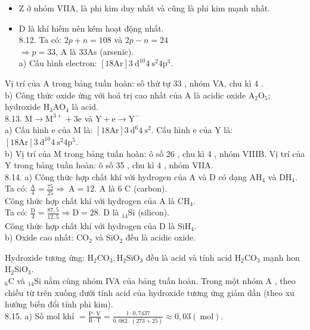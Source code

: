 \documentclass[10pt]{article}
\begin{document}
\begin{itemize}
  \item Z ở nhóm VIIA, là phi kim duy nhất và cũng là phi kim mạnh nhất.
  \item D là khí hiếm nên kém hoạt động nhất.\\
8.12. Ta có: $2 p+n=108$ và $2 p-n=24$\\
$\Rightarrow p=33$, A là 33As (arsenic).\\
a) Cấu hình electron: $[18 \mathrm{Ar}] 3 \mathrm{~d}^{10} 4 \mathrm{~s}^{2} 4 \mathrm{p}^{3}$.
\end{itemize}

Vị trí của A trong bảng tuần hoàn: số thứ tự 33 , nhóm VA, chu kì 4 .\\
b) Công thức oxide ứng với hoá trị cao nhất của A là acidic oxide $\mathrm{A}_{2} \mathrm{O}_{5}$; hydroxide $\mathrm{H}_{3} \mathrm{AO}_{4}$ là acid.\\
8.13. $\mathrm{M} \rightarrow \mathrm{M}^{3+}+3 \mathrm{e}$ và $\mathrm{Y}+\mathrm{e} \rightarrow \mathrm{Y}^{-}$\\
a) Cấu hình e của M là: $[18 \mathrm{Ar}] 3 \mathrm{~d}^{6} 4 \mathrm{~s}^{2}$. Cấu hình e của Y là: $[18 \mathrm{Ar}] 3 \mathrm{~d}^{10} 4 \mathrm{~s}^{2} 4 \mathrm{p}^{5}$.\\
b) Vị trí của M trong bảng tuần hoàn: ô số 26 , chu kì 4 , nhóm VIIIB. Vị trí của Y trong bảng tuần hoàn: ô số 35 , chu kì 4 , nhóm VIIA.\\
8.14. a) Công thức hợp chất khí với hydrogen của A và D có dạng $\mathrm{AH}_{4}$ và $\mathrm{DH}_{4}$. Ta có: $\frac{\mathrm{A}}{4}=\frac{75}{25} \Rightarrow \mathrm{~A}=12$. A là 6 C (carbon).\\
Công thức hợp chất khí với hydrogen của A là $\mathrm{CH}_{4}$.\\
Ta có: $\frac{\mathrm{D}}{4}=\frac{87,5}{12,5} \Rightarrow \mathrm{D}=28$. D là ${ }_{14} \mathrm{Si}$ (silicon).\\
Công thức hợp chất khí với hydrogen của D là $\mathrm{SiH}_{4}$.\\
b) Oxide cao nhất: $\mathrm{CO}_{2}$ và $\mathrm{SiO}_{2}$ đều là acidic oxide.

Hydroxide tương ứng: $\mathrm{H}_{2} \mathrm{CO}_{3}, \mathrm{H}_{2} \mathrm{SiO}_{3}$ đều là acid và tính acid $\mathrm{H}_{2} \mathrm{CO}_{3}$ mạnh hon $\mathrm{H}_{2} \mathrm{SiO}_{3}$.\\
${ }_{6} \mathrm{C}$ và ${ }_{14} \mathrm{Si}$ nằm cùng nhóm IVA của bảng tuần hoàn. Trong một nhóm A , theo chiều từ trên xuống dưới tính acid của hydroxide tương ứng giảm dần (theo xu hướng biến đổi tính phi kim).\\
8.15. a) Số mol khí $=\frac{\mathrm{P} \cdot \mathrm{V}}{\mathrm{R} \cdot \mathrm{T}}=\frac{1 \cdot 0,7437}{0,082 \cdot(273+25)} \approx 0,03(\mathrm{~mol})$.
\end{document}
